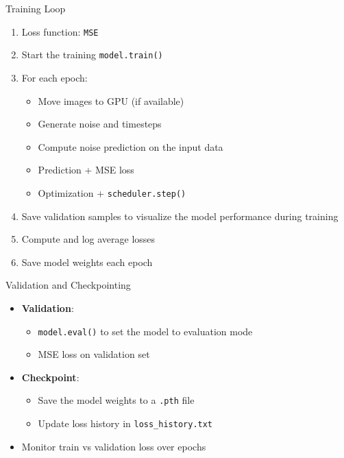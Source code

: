 \begin{frame}{Training Loop}
    \begin{enumerate}
        \item Loss function: \texttt{MSE}
        \item Start the training \texttt{model.train()}
        \item For each epoch:
              \begin{itemize}
                  \item Move images to GPU (if available)
                  \item Generate noise and timesteps
                  \item Compute noise prediction on the input data
                  \item Prediction + MSE loss
                  \item Optimization + \texttt{scheduler.step()}
              \end{itemize}
        \item Save validation samples to visualize the model performance during training
        \item Compute and log average losses
        \item Save model weights each epoch
    \end{enumerate}
\end{frame}

\begin{frame}{Validation and Checkpointing}
    \begin{itemize}
        \item \textbf{Validation}:
              \begin{itemize}
                  \item \texttt{model.eval()} to set the model to evaluation mode
                  \item MSE loss on validation set
              \end{itemize}
        \item \textbf{Checkpoint}:
              \begin{itemize}
                  \item Save the model weights to a \texttt{.pth} file
                  \item Update loss history in \texttt{loss\_history.txt}
              \end{itemize}
        \item Monitor train vs validation loss over epochs
    \end{itemize}
\end{frame}

